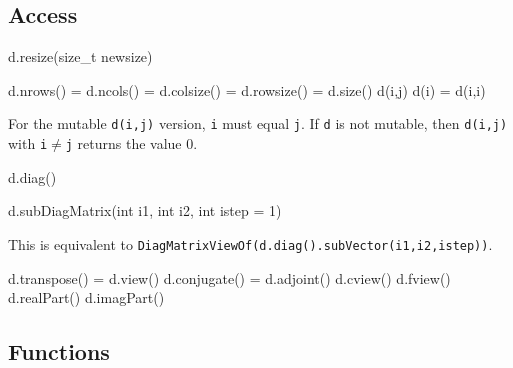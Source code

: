 \documentclass[twoside,letterpaper,11pt]{article}
\renewcommand{\tt}[1]{{\lstinline {#1}}}
\begin{document}
\subsection{Access}
\label{DiagMatrix_Access}

\begin{tmvcode}
d.resize(size_t newsize)
\end{tmvcode}

\begin{tmvcode}
d.nrows() = d.ncols() = d.colsize() = d.rowsize() = d.size()
d(i,j)
d(i) = d(i,i)
\end{tmvcode}
For the mutable \tt{d(i,j)} version, 
\tt{i} must equal \tt{j}.
If \tt{d} is not mutable, then \tt{d(i,j)} with \tt{i}$\neq$\tt{j} returns the 
value 0.

\begin{tmvcode}
d.diag()
\end{tmvcode}

\begin{tmvcode}
d.subDiagMatrix(int i1, int i2, int istep = 1)
\end{tmvcode}
This is equivalent to \tt{DiagMatrixViewOf(d.diag().subVector(i1,i2,istep))}.
\begin{tmvcode}
d.transpose() = d.view()
d.conjugate() = d.adjoint()
d.cview()
d.fview()
d.realPart()
d.imagPart()
\end{tmvcode}

\subsection{Functions}
\label{DiagMatrix_Functions}
\end{document}
